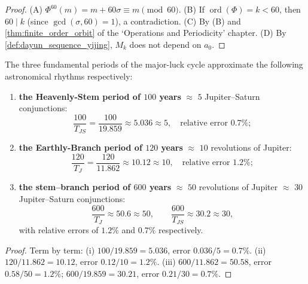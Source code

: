 \begin{proof}
(A) $\Phi^{60}(m)=m+60\sigma\equiv m\pmod{60}$.
(B) If $\operatorname{ord}(\Phi)=k<60$, then $60\mid k$ (since $\gcd(\sigma,60)=1$), a contradiction.
(C) By (B) and \cref{thm:finite_order_orbit} of the `Operations and Periodicity' chapter.
(D) By \cref{def:dayun_sequence_yijing}, $M_k$ does not depend on $a_0$.
\end{proof}

\begin{corollary}\label{cor:dayun_triple_approximation_yijing}
The three fundamental periods of the major-luck cycle approximate the following astronomical rhythms respectively:
\begin{enumerate}[label=(\roman*)]
    \item \textbf{the Heavenly-Stem period of $100$ years} $\approx$ $5$ Jupiter--Saturn conjunctions:
    \[
    \frac{100}{T_{JS}}=\frac{100}{19.859}\approx 5.036\approx 5,\quad\text{relative error }0.7\%;
    \]
    \item \textbf{the Earthly-Branch period of $120$ years} $\approx$ $10$ revolutions of Jupiter:
    \[
    \frac{120}{T_J}=\frac{120}{11.862}\approx 10.12\approx 10,\quad\text{relative error }1.2\%;
    \]
    \item \textbf{the stem--branch period of $600$ years} $\approx$ $50$ revolutions of Jupiter $\approx$ $30$ Jupiter--Saturn conjunctions:
    \[
    \frac{600}{T_J}\approx 50.6\approx 50,\qquad \frac{600}{T_{JS}}\approx 30.2\approx 30,
    \]
    with relative errors of $1.2\%$ and $0.7\%$ respectively.
\end{enumerate}
\end{corollary}

\begin{proof}
Term by term:
(i) $100/19.859=5.036$, error $0.036/5=0.7\%$.
(ii) $120/11.862=10.12$, error $0.12/10=1.2\%$.
(iii) $600/11.862=50.58$, error $0.58/50=1.2\%$; $600/19.859=30.21$, error $0.21/30=0.7\%$.
\end{proof}

